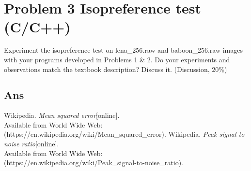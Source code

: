 \documentclass[a4paper, 11pt]{article}
\begin{document}
\section*{Problem 3 Isopreference test (C/C++)}
  Experiment the isopreference test on lena\_256.raw and baboon\_256.raw images with your
  programs developed in Problems 1 \& 2. Do your experiments and observations match the textbook
  description? Discuss it. (Discussion, 20\%)
  \subsection*{Ans}

\begin{thebibliography}{9}
   Wikipedia. \emph{Mean squared error}[online]. \\
  Available from World Wide Web: (https://en.wikipedia.org/wiki/Mean\_squared\_error).
   Wikipedia. \emph{Peak signal-to-noise ratio}[online].\\
  Available from World Wide Web: \\
  (https://en.wikipedia.org/wiki/Peak\_signal-to-noise\_ratio).
\end{thebibliography}
\end{document}
